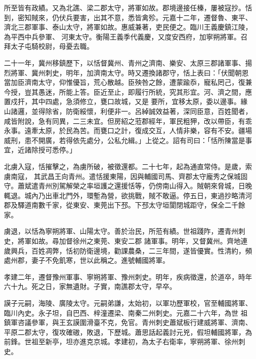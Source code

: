 \begin{pinyinscope}
 所至皆有政績。又為北譙、梁二郡太守，將軍如故。郡境邊接任榛，屢被寇抄。恬到，密知賊來，仍伏兵要害，出其不意，悉皆禽殄。元嘉十二年，遷督魯、東平、濟北三郡軍事、泰山太守，將軍如故。惠威兼著，吏民便之。臨川王義慶鎮江陵，為平西中兵參軍、
 河東太守。衡陽王義季代義慶，又度安西府，加寧朔將軍。召拜太子屯騎校尉，母憂去職。



 二十一年，冀州移鎮歷下，以恬督冀州、青州之濟南、樂安、太原三郡諸軍事、揚烈將軍、冀州刺史，明年，加濟南太守。時又遷換諸郡守，恬上表曰：「伏聞朝恩當加臣濟南太守，仰惟優旨，荒心散越。臣殃咎之餘，遭蒙踰忝，寵私罔己，復兼今授，豈其愚迷，所能上答。臣近至止，即履行所統，究其形宜。河、濟之間，應置戍扞，其中四處，急須修立，甕口故城，又是
 要所，宜移太原，委以邊事。緣山諸邏，並得除省，防衛綏懷，利便非一。呂綽誠效益著，深同臣意，百姓聞者，咸皆附說，急有同異，二三未宜。但房紹之蒞郡經年，軍民粗狎，改以帶臣，有乖永事。遠牽太原，於民為苦。而甕口之計，復成交互，人情非樂，容有不安。疆場威刑，患不開廣，若得依先處分，公私允緝。」上從之。詔有司曰：「恬所陳當是事宜，近諸除授可悉停。」



 北虜入寇，恬摧擊之，為虜所破，被徵還都。二十七年，起為通直常侍。是歲，索虜南寇，
 其武昌王向青州。遣恬援東陽，因與輔國司馬、齊郡太守龐秀之保城固守。蕭斌遣青州別駕解榮之率垣護之還援恬等，仍傍南山得入。賊朝來脅城，日晚輒退。城內乃出車北門外，環塹為營，欲挑戰，賊不敢逼。停五日，東過抄略清河郡及驛道南數千家，從東安、東莞出下邳。下邳太守垣閬閉城距守，保全二千餘家。



 虜退，以恬為寧朔將軍、山陽太守。善於治民，所蒞有績。世祖踐阼，遷青州刺史，將軍如故。尋加督徐州之東莞、東安二郡
 諸軍事。明年，又督冀州。齊地連歲興兵，百姓凋弊，恬初防衛邊境，勸課農桑，二三年間，遂皆優實。性清約，頻處州郡，妻子不免飢寒，世以此稱之。進號輔國將軍。



 孝建二年，遷督豫州軍事、寧朔將軍、豫州刺史。明年，疾病徵還，於道卒，時年六十九。死之日，家無遺財。子實，南譙郡太守，早卒。



 謨子元嗣，海陵、廣陵太守。元嗣弟謙，太始初，以軍功歷軍校，官至輔國將軍、臨川內史。永子坦，自巴西、梓潼遷梁、南秦二州刺史。元嘉二十六年，為世
 祖鎮軍咨議參軍，與王玄謨圍滑臺不克，免官。青州刺史蕭斌板行建威將軍、濟南、平原二郡太守，復攻確磝，敗退，下歷城。蕭思話起義討元兇，假坦輔國將軍，為前鋒。世祖至新亭，坦亦進克京城。孝建初，為太子右衛率，寧朔將軍、徐州刺史。




\end{pinyinscope}
